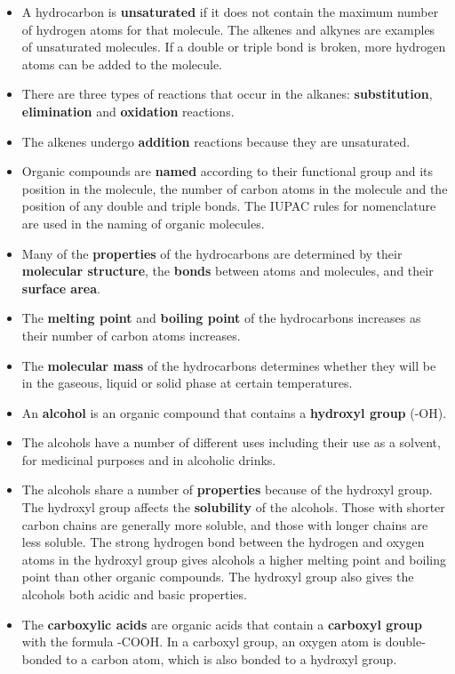 \begin{itemize}
\item{A hydrocarbon is \textbf{unsaturated} if it does not contain the maximum number of hydrogen atoms for that molecule. The alkenes and alkynes are examples of unsaturated molecules. If a double or triple bond is broken, more hydrogen atoms can be added to the molecule.}
\item{There are three types of reactions that occur in the alkanes: \textbf{substitution}, \textbf{elimination} and \textbf{oxidation} reactions.}
\item{The alkenes undergo \textbf{addition} reactions because they are unsaturated.}
\item{Organic compounds are \textbf{named} according to their functional group and its position in the molecule, the number of carbon atoms in the molecule and the position of any double and triple bonds. The IUPAC rules for nomenclature are used in the naming of organic molecules.}
\item{Many of the \textbf{properties} of the hydrocarbons are determined by their \textbf{molecular structure}, the \textbf{bonds} between atoms and molecules, and their \textbf{surface area}.}
\item{The \textbf{melting point} and \textbf{boiling point} of the hydrocarbons increases as their number of carbon atoms increases.}
\item{The \textbf{molecular mass} of the hydrocarbons determines whether they will be in the gaseous, liquid or solid phase at certain temperatures.}
\item{An \textbf{alcohol} is an organic compound that contains a \textbf{hydroxyl group} (-OH).}
\item{The alcohols have a number of different uses including their use as a solvent, for medicinal purposes and in alcoholic drinks.}
\item{The alcohols share a number of \textbf{properties} because of the hydroxyl group. The hydroxyl group affects the \textbf{solubility} of the alcohols. Those with shorter carbon chains are generally more soluble, and those with longer chains are less soluble. The strong hydrogen bond between the hydrogen and oxygen atoms in the hydroxyl group gives alcohols a higher melting point and boiling point than other organic compounds. The hydroxyl group also gives the alcohols both acidic and basic properties.}
\item{The \textbf{carboxylic acids} are organic acids that contain a \textbf{carboxyl group} with the formula -COOH. In a carboxyl group, an oxygen atom is double-bonded to a carbon atom, which is also bonded to a hydroxyl group.}

\end{itemize}
